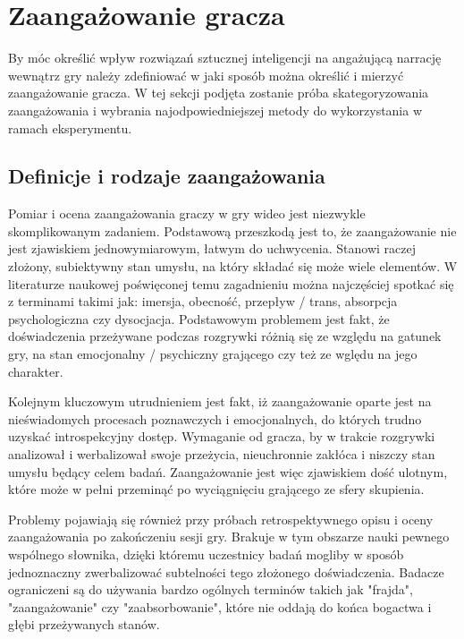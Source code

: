 \graphicspath{{chapters/chapter5/imgs/}}

\chapter{Zaangażowanie gracza}\label{chapter:ch5}

By móc określić wpływ rozwiązań sztucznej inteligencji na angażującą narrację wewnątrz gry należy
zdefiniować w jaki sposób można określić i mierzyć zaangażowanie gracza. W tej sekcji podjęta
zostanie próba skategoryzowania zaangażowania i wybrania najodpowiedniejszej metody do wykorzystania
w ramach eksperymentu.

\section{Definicje i rodzaje zaangażowania}\label{section:ch5_1}

Pomiar i ocena zaangażowania graczy w gry wideo jest niezwykle skomplikowanym zadaniem.
Podstawową przeszkodą jest to, że zaangażowanie nie jest zjawiskiem jednowymiarowym\cite{eng_in_games}, łatwym do
uchwycenia\cite{measuring_user_exp}. Stanowi raczej złożony, subiektywny stan umysłu, na który składać się
może wiele elementów. W literaturze naukowej poświęconej temu zagadnieniu można najczęściej spotkać się z terminami
takimi jak: imersja, obecność, przepływ / trans, absorpcja psychologiczna czy dysocjacja. Podstawowym problemem
jest fakt, że doświadczenia przeżywane podczas rozgrywki różnią się ze względu na gatunek gry, na stan
emocjonalny / psychiczny grającego czy też ze wględu na jego charakter\cite{measuring_user_exp}.

Kolejnym kluczowym utrudnieniem jest fakt, iż zaangażowanie oparte jest na
nieświadomych procesach poznawczych i emocjonalnych, do których trudno uzyskać
introspekcyjny dostęp\cite{measuring_user_exp}. Wymaganie od gracza, by w trakcie rozgrywki analizował i werbalizował swoje
przeżycia, nieuchronnie zakłóca i niszczy stan umysłu będący celem badań.
Zaangażowanie jest więc zjawiskiem dość ulotnym, które może w pełni przeminąć po wyciągnięciu grającego
ze sfery skupienia\cite{measuring_user_exp}.

Problemy pojawiają się również przy próbach retrospektywnego opisu i oceny zaangażowania po zakończeniu
sesji gry. Brakuje w tym obszarze nauki pewnego wspólnego słownika, dzięki któremu uczestnicy badań mogliby
w sposób jednoznaczny zwerbalizować subtelności tego złożonego doświadczenia\cite{measuring_user_exp}.
Badacze ograniczeni są do używania bardzo ogólnych terminów takich jak "frajda",
"zaangażowanie" czy "zaabsorbowanie", które nie oddają do końca bogactwa i głębi przeżywanych
stanów\cite{measuring_user_exp}.

